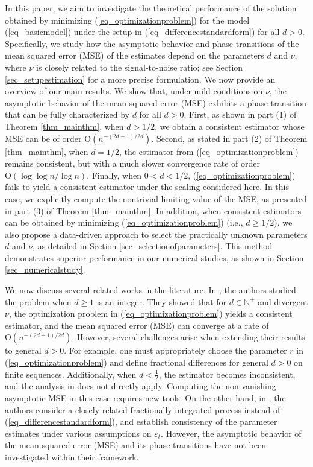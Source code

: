 \documentclass[11pt]{article}
\numberwithin{equation}{section}
\numberwithin{figure}{section}
\begin{document}
In this paper, we aim to investigate the theoretical performance of the solution obtained by minimizing (\ref{eq_optimizationproblem}) for the model (\ref{eq_basicmodel}) under the setup in (\ref{eq_differencestandardform}) for all $d > 0$. Specifically, we study how the asymptotic behavior and phase transitions of the mean squared error (MSE) of the estimates depend on the parameters $d$ and $\nu$, where $\nu$ is closely related to the signal-to-noise ratio; see Section \ref{sec_setupestimation} for a more precise formulation.  We now provide an overview of our main results. We show that, under mild conditions on $\nu$, the asymptotic behavior of the mean squared error (MSE) exhibits a phase transition that can be fully characterized by $d$ for all $d > 0$. First, as shown in part (1) of Theorem \ref{thm_mainthm}, when $d > 1/2$, we obtain a consistent estimator whose MSE can be of order $\mathrm{O}\left( n^{-(2d - 1)/2d} \right)$. Second, as stated in part (2) of Theorem \ref{thm_mainthm}, when $d = 1/2$, the estimator from (\ref{eq_optimizationproblem}) remains consistent, but with a much slower convergence rate of order $\mathrm{O}\left( \log \log n / \log n \right)$. Finally, when $0 < d < 1/2$, (\ref{eq_optimizationproblem}) fails to yield a consistent estimator under the scaling considered here. In this case, we explicitly compute the nontrivial limiting value of the MSE, as presented in part (3) of Theorem \ref{thm_mainthm}. In addition, when consistent estimators can be obtained by minimizing (\ref{eq_optimizationproblem}) (i.e., $d \geq 1/2$), we also propose a data-driven approach to select the practically unknown parameters $d$ and $\nu$, as detailed in Section \ref{sec_selectionofparameters}. This method demonstrates superior performance in our numerical studies, as shown in Section \ref{sec_numericalstudy}.   

  
We now discuss several related works in the literature. In \cite{burman_shumway2009estimation}, the authors studied the problem when $d \geq 1$ is an integer. They showed that for $d \in \mathbb{N}^+$ and divergent $\nu$, the optimization problem in (\ref{eq_optimizationproblem}) yields a consistent estimator, and the mean squared error (MSE) can converge at a rate of $\mathrm{O}\left( n^{-(2d - 1)/2d} \right)$. However, several challenges arise when extending their results to general $d > 0$. For example, one must appropriately choose the parameter $r$ in (\ref{eq_optimizationproblem}) and define fractional differences for general $d > 0$ on finite sequences. Additionally, when $d < \frac{1}{2}$, the estimator becomes inconsistent, and the analysis in \cite{burman_shumway2009estimation} does not directly apply. Computing the non-vanishing asymptotic MSE in this case requires new tools. On the other hand, in \cite{CHANAOS, hang2006estimation, hartl2025robust, hartl2022approximate, nielsen2015asymptotics}, the authors consider a closely related fractionally integrated process instead of (\ref{eq_differencestandardform}), and establish consistency of the parameter estimates under various assumptions on ${\varepsilon_t}$. However, the asymptotic behavior of the mean squared error (MSE) and its phase transitions have not been investigated within their framework.   
\end{document}
